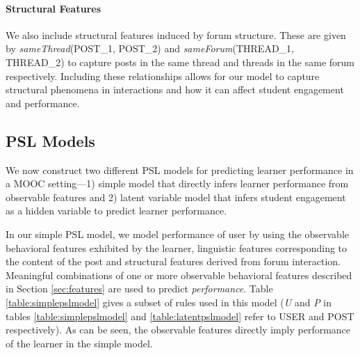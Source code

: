 \paragraph{Structural Features}
We also include structural features induced by forum structure. These are given by \textit{sameThread}(POST\_1, POST\_2) and \textit{sameForum}(THREAD\_1, THREAD\_2) to capture posts in the same thread and threads in the same forum respectively. Including these relationships allows for our model to capture structural phenomena in interactions and how it can affect student engagement and performance.

\subsection{PSL Models}
\label{sec:pslmodels}
We now construct two different PSL models for predicting learner performance in a MOOC setting---1) simple model that directly infers learner performance from observable features and 2) latent variable model that infers student engagement as a hidden variable to predict learner performance.

In our simple PSL model, we model performance of user by using the observable behavioral features exhibited by the learner, linguistic features corresponding to the content of the post and structural features derived from forum interaction. Meaningful combinations of one or more observable behavioral features described in Section \ref{sec:features} are used to predict \emph{performance}. Table \ref{table:simplepslmodel} gives a subset of rules used in this model (\emph{U} and \emph{P} in tables \ref{table:simplepslmodel} and \ref{table:latentpslmodel} refer to USER and POST respectively). As can be seen, the observable features directly imply performance of the learner in the simple model.


